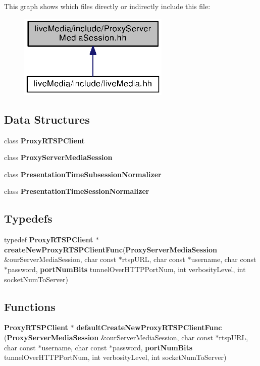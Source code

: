 This graph shows which files directly or indirectly include this file\+:
\nopagebreak
\begin{figure}[H]
\begin{center}
\leavevmode
\includegraphics[width=204pt]{ProxyServerMediaSession_8hh__dep__incl}
\end{center}
\end{figure}
\subsection*{Data Structures}
\begin{DoxyCompactItemize}
\item 
class {\bf Proxy\+R\+T\+S\+P\+Client}
\item 
class {\bf Proxy\+Server\+Media\+Session}
\item 
class {\bf Presentation\+Time\+Subsession\+Normalizer}
\item 
class {\bf Presentation\+Time\+Session\+Normalizer}
\end{DoxyCompactItemize}
\subsection*{Typedefs}
\begin{DoxyCompactItemize}
\item 
typedef {\bf Proxy\+R\+T\+S\+P\+Client} $\ast$ {\bf create\+New\+Proxy\+R\+T\+S\+P\+Client\+Func}({\bf Proxy\+Server\+Media\+Session} \&our\+Server\+Media\+Session, char const $\ast$rtsp\+U\+R\+L, char const $\ast$username, char const $\ast$password, {\bf port\+Num\+Bits} tunnel\+Over\+H\+T\+T\+P\+Port\+Num, int verbosity\+Level, int socket\+Num\+To\+Server)
\end{DoxyCompactItemize}
\subsection*{Functions}
\begin{DoxyCompactItemize}
\item 
{\bf Proxy\+R\+T\+S\+P\+Client} $\ast$ {\bf default\+Create\+New\+Proxy\+R\+T\+S\+P\+Client\+Func} ({\bf Proxy\+Server\+Media\+Session} \&our\+Server\+Media\+Session, char const $\ast$rtsp\+U\+R\+L, char const $\ast$username, char const $\ast$password, {\bf port\+Num\+Bits} tunnel\+Over\+H\+T\+T\+P\+Port\+Num, int verbosity\+Level, int socket\+Num\+To\+Server)
\end{DoxyCompactItemize}


